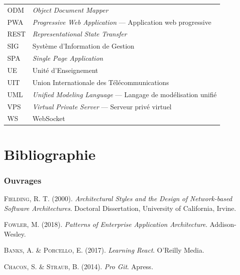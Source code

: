 \documentclass[12pt,a4paper,oneside]{report}
\begin{document}
\begin{longtable}{lp{12cm}}
  ODM & \textit{Object Document Mapper} \\
  PWA & \textit{Progressive Web Application} — Application web progressive \\
  REST & \textit{Representational State Transfer} \\
  SIG & Système d'Information de Gestion \\
  SPA & \textit{Single Page Application} \\
  UE & Unité d'Enseignement \\
  UIT & Union Internationale des Télécommunications \\
  UML & \textit{Unified Modeling Language} — Langage de modélisation unifié \\
  VPS & \textit{Virtual Private Server} — Serveur privé virtuel \\
  WS & WebSocket \\
  \bottomrule
\end{longtable}

\clearpage
\listoftables
{}

\clearpage
\listoffigures
{}

\clearpage

\chapter*{Bibliographie}

\subsection*{Ouvrages}

\begin{enumerate}[label={[\arabic*]}]
  \item \textsc{Fielding}, R. T. (2000). \textit{Architectural Styles and the Design of Network-based Software Architectures}. Doctoral Dissertation, University of California, Irvine.
  \item \textsc{Fowler}, M. (2018). \textit{Patterns of Enterprise Application Architecture}. Addison-Wesley.
  \item \textsc{Banks}, A. \& \textsc{Porcello}, E. (2017). \textit{Learning React}. O'Reilly Media.
  \item \textsc{Chacon}, S. \& \textsc{Straub}, B. (2014). \textit{Pro Git}. Apress.
\end{enumerate}
\end{document}
